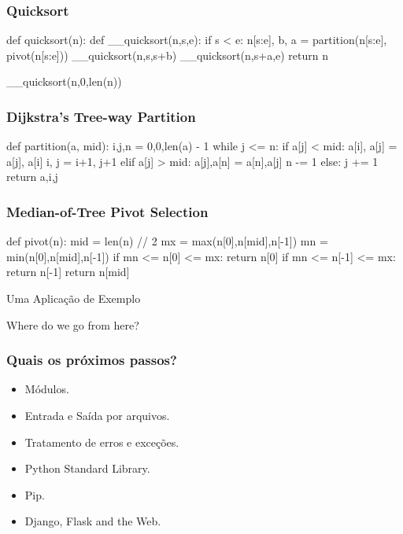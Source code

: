 \begin{frame}[fragile]
    \frametitle{Quicksort}
    \begin{python}
     def quicksort(n):
         def __quicksort(n,s,e):
             if s <  e:
                 n[s:e], b, a = partition(n[s:e], pivot(n[s:e]))
                 __quicksort(n,s,s+b)
                 __quicksort(n,s+a,e)
             return n

         __quicksort(n,0,len(n))
    \end{python}
\end{frame}

\begin{frame}[fragile]
    \frametitle{Dijkstra's Tree-way Partition}
    \begin{python}
    def partition(a, mid):
        i,j,n = 0,0,len(a) - 1
        while j <= n:
            if a[j] < mid:
                a[i], a[j] = a[j], a[i]
                i, j = i+1, j+1
            elif a[j] > mid:
                a[j],a[n] = a[n],a[j]
                n -= 1
            else: j += 1
        return a,i,j
    \end{python}
\end{frame}

\begin{frame}[fragile]
    \frametitle{Median-of-Tree Pivot Selection}
    \begin{python}
    def pivot(n):
        mid = len(n) // 2
        mx = max(n[0],n[mid],n[-1])
        mn = min(n[0],n[mid],n[-1])
        if mn <= n[0] <= mx: return n[0]
        if mn <= n[-1] <= mx: return n[-1]
        return n[mid]
    \end{python}
\end{frame}

\begin{frame}
    \begin{center}
        \Huge Uma Aplicação de Exemplo
    \end{center}
\end{frame}

\begin{frame}
    \huge{Where do we go from here?}
\end{frame}

\begin{frame}
    \frametitle{Quais os próximos passos?}
    \begin{itemize}
        \item Módulos.
        \item Entrada e Saída por arquivos.
        \item Tratamento de erros e exceções.
        \item Python Standard Library.
        \item Pip.
        \item Django, Flask and the Web.
    \end{itemize}
\end{frame}

